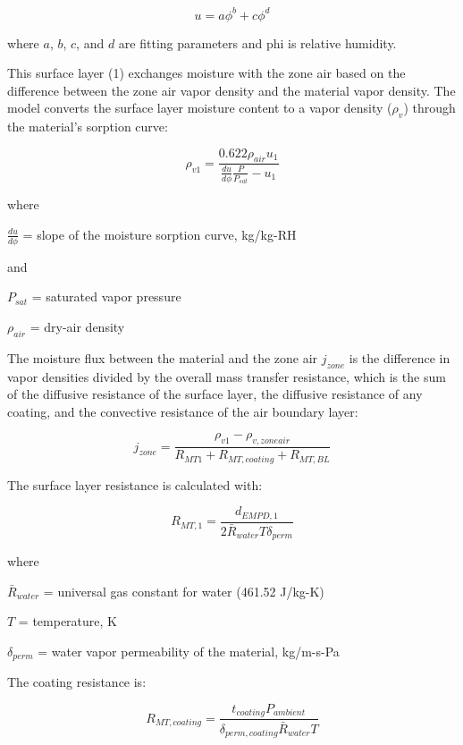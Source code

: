 \begin{equation}
u = a \phi^b + c \phi^d
\end{equation}

where $a$, $b$, $c$, and $d$ are fitting parameters and phi is relative humidity.

This surface layer (1) exchanges moisture with the zone air based on the difference between the zone air vapor density and the material vapor density. The model converts the surface layer moisture content to a vapor density ($\rho_v$) through the material's sorption curve:

\begin{equation}
\rho_{v1} = \frac {0.622 \rho_{air} u_{1}} {\frac{du}{d\phi} \frac{P}{P_{sat}} - u_{1}}
\end{equation}

where

$\frac{du}{d\phi}$ = slope of the moisture sorption curve, kg/kg-RH

and

$P_{sat}$ = saturated vapor pressure

$\rho_{air}$ = dry-air density

The moisture flux between the material and the zone air $j_{zone}$ is the difference in vapor densities divided by the overall mass transfer resistance, which is the sum of the diffusive resistance of the surface layer, the diffusive resistance of any coating, and the convective resistance of the air boundary layer:

\begin{equation}
j_{zone} = \frac{\rho_{v1} - \rho_{v,zoneair}}{R_{MT1} + R_{MT,coating} + R_{MT,BL}}
\end{equation}

The surface layer resistance is calculated with:

\begin{equation}
R_{MT,1} = \frac{d_{EMPD,1}} {2 \bar R_{water} T \delta_{perm}}
\end{equation}

where

$\bar R_{water}$ = universal gas constant for water (461.52 J/kg-K)

$T$ = temperature, K

$\delta_{perm}$ = water vapor permeability of the material, kg/m-s-Pa

The coating resistance is:

\begin{equation}
R_{MT,coating} = \frac {t_{coating} P_{ambient}} {\delta_{perm,coating} \bar R_{water} T}
\end{equation}

